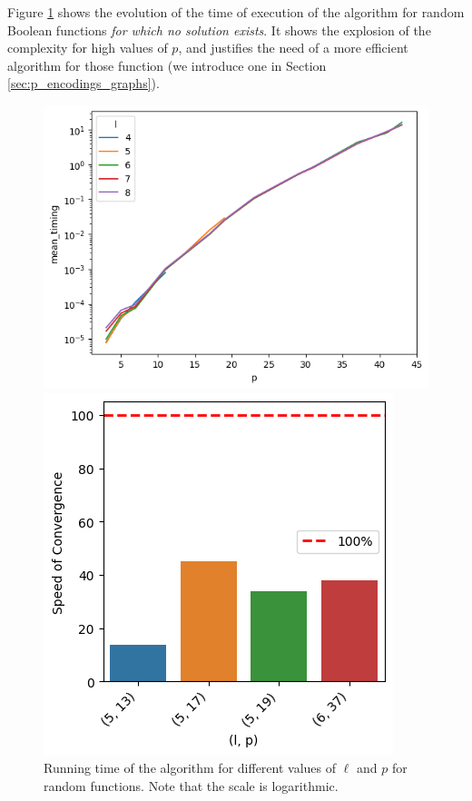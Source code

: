 Figure \ref{fig:lineplot_timings} shows the evolution of the time of execution of the algorithm for random Boolean functions \emph{for which no solution exists}. It shows the explosion of the complexity for high values of $p$, and justifies the need of a more efficient algorithm for those function (we introduce one in Section \ref{sec:p_encodings_graphs}).  



\begin{figure}
    \centering
    \begin{minipage}{0.55\textwidth}
        \centering
        \includegraphics[width=\linewidth]{img/p_encodings/lineplot_timings.png}
        \caption{Running time of the algorithm for different values of $\ell$ and $p$ for random functions. Note that the scale is logarithmic.}        
        \label{fig:lineplot_timings}
        \end{minipage}\hspace{0.04\textwidth}
    \begin{minipage}{0.35\textwidth}
        \centering
        \includegraphics[width=\linewidth]{img/p_encodings/barplot.png}

\end{minipage}
\end{figure}
